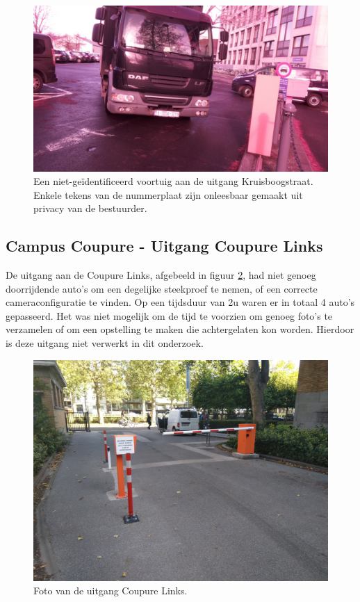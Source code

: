 \begin{figure}[h!]
	\centering
	\includegraphics[width=0.8\linewidth]{img/kruisboog/kruisboog-incorrect.jpg}
	\caption{Een niet-geïdentificeerd voortuig aan de uitgang Kruisboogstraat. Enkele tekens van de nummerplaat zijn onleesbaar gemaakt uit privacy van de bestuurder.}
	\label{fig:kruisboog-incorrect}
\end{figure}

\subsection{Campus Coupure - Uitgang Coupure Links}
De uitgang aan de Coupure Links, afgebeeld in figuur \ref{fig:coupure-links}, had niet genoeg doorrijdende auto's om een degelijke steekproef te nemen, of een correcte cameraconfiguratie te vinden. Op een tijdsduur van 2u waren er in totaal 4 auto's gepasseerd. Het was niet mogelijk om de tijd te voorzien om genoeg foto's te verzamelen of om een opstelling te maken die achtergelaten kon worden. Hierdoor is deze uitgang niet verwerkt in dit onderzoek.

\begin{figure}[h!]
	\centering
	\includegraphics[width=0.8\linewidth]{img/coupure-links/coupure-links.jpg}
	\caption{Foto van de uitgang Coupure Links.}
	\label{fig:coupure-links}
\end{figure}

